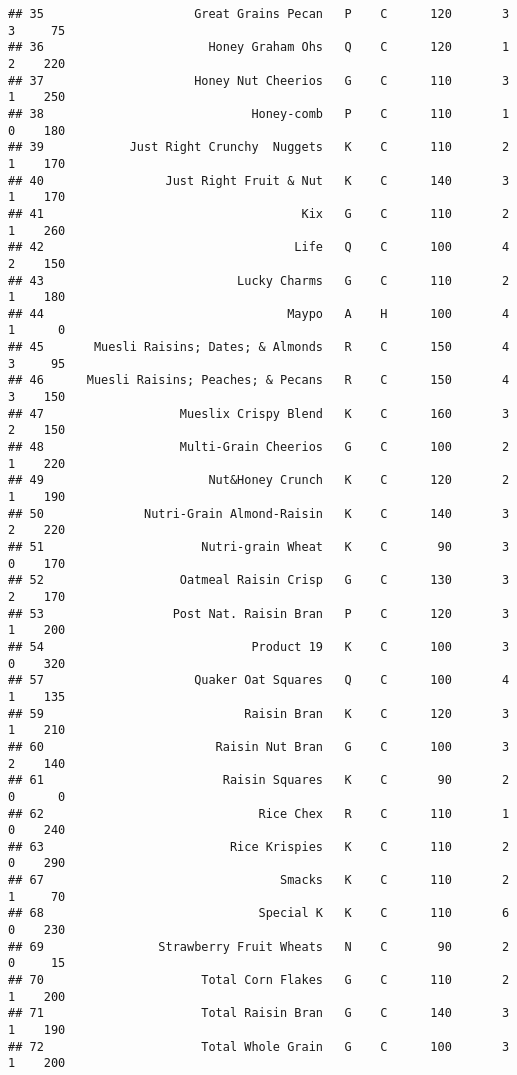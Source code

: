 \documentclass[
]{article}
\begin{document}
\begin{verbatim}
## 35                     Great Grains Pecan   P    C      120       3   3     75
## 36                       Honey Graham Ohs   Q    C      120       1   2    220
## 37                     Honey Nut Cheerios   G    C      110       3   1    250
## 38                             Honey-comb   P    C      110       1   0    180
## 39            Just Right Crunchy  Nuggets   K    C      110       2   1    170
## 40                 Just Right Fruit & Nut   K    C      140       3   1    170
## 41                                    Kix   G    C      110       2   1    260
## 42                                   Life   Q    C      100       4   2    150
## 43                           Lucky Charms   G    C      110       2   1    180
## 44                                  Maypo   A    H      100       4   1      0
## 45       Muesli Raisins; Dates; & Almonds   R    C      150       4   3     95
## 46      Muesli Raisins; Peaches; & Pecans   R    C      150       4   3    150
## 47                   Mueslix Crispy Blend   K    C      160       3   2    150
## 48                   Multi-Grain Cheerios   G    C      100       2   1    220
## 49                       Nut&Honey Crunch   K    C      120       2   1    190
## 50              Nutri-Grain Almond-Raisin   K    C      140       3   2    220
## 51                      Nutri-grain Wheat   K    C       90       3   0    170
## 52                   Oatmeal Raisin Crisp   G    C      130       3   2    170
## 53                  Post Nat. Raisin Bran   P    C      120       3   1    200
## 54                             Product 19   K    C      100       3   0    320
## 57                     Quaker Oat Squares   Q    C      100       4   1    135
## 59                            Raisin Bran   K    C      120       3   1    210
## 60                        Raisin Nut Bran   G    C      100       3   2    140
## 61                         Raisin Squares   K    C       90       2   0      0
## 62                              Rice Chex   R    C      110       1   0    240
## 63                          Rice Krispies   K    C      110       2   0    290
## 67                                 Smacks   K    C      110       2   1     70
## 68                              Special K   K    C      110       6   0    230
## 69                Strawberry Fruit Wheats   N    C       90       2   0     15
## 70                      Total Corn Flakes   G    C      110       2   1    200
## 71                      Total Raisin Bran   G    C      140       3   1    190
## 72                      Total Whole Grain   G    C      100       3   1    200

\end{verbatim}
\end{document}
